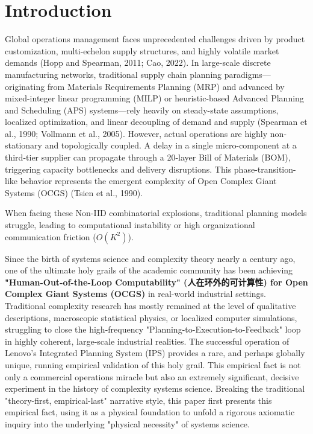 \documentclass[11pt,a4paper]{article}
\begin{document}
\section{Introduction}
Global operations management faces unprecedented challenges driven by product customization, multi-echelon supply structures, and highly volatile market demands (Hopp and Spearman, 2011; Cao, 2022). In large-scale discrete manufacturing networks, traditional supply chain planning paradigms—originating from Materials Requirements Planning (MRP) and advanced by mixed-integer linear programming (MILP) or heuristic-based Advanced Planning and Scheduling (APS) systems—rely heavily on steady-state assumptions, localized optimization, and linear decoupling of demand and supply (Spearman et al., 1990; Vollmann et al., 2005). However, actual operations are highly non-stationary and topologically coupled. A delay in a single micro-component at a third-tier supplier can propagate through a 20-layer Bill of Materials (BOM), triggering capacity bottlenecks and delivery disruptions. This phase-transition-like behavior represents the emergent complexity of Open Complex Giant Systems (OCGS) (Tsien et al., 1990).

When facing these Non-IID combinatorial explosions, traditional planning models struggle, leading to computational instability or high organizational communication friction ($O(K^2)$).

Since the birth of systems science and complexity theory nearly a century ago, one of the ultimate holy grails of the academic community has been achieving \textbf{"Human-Out-of-the-Loop Computability" (人在环外的可计算性) for Open Complex Giant Systems (OCGS)} in real-world industrial settings. Traditional complexity research has mostly remained at the level of qualitative descriptions, macroscopic statistical physics, or localized computer simulations, struggling to close the high-frequency "Planning-to-Execution-to-Feedback" loop in highly coherent, large-scale industrial realities. The successful operation of Lenovo's Integrated Planning System (IPS) provides a rare, and perhaps globally unique, running empirical validation of this holy grail. This empirical fact is not only a commercial operations miracle but also an extremely significant, decisive experiment in the history of complexity systems science. Breaking the traditional "theory-first, empirical-last" narrative style, this paper first presents this empirical fact, using it as a physical foundation to unfold a rigorous axiomatic inquiry into the underlying "physical necessity" of systems science.
\end{document}
